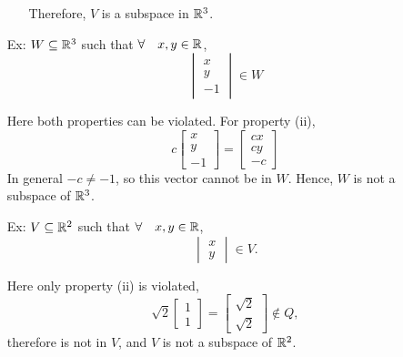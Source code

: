\documentclass[reqno]{amsart}
\theoremstyle{definition}
\begin{document}
\begin{enumerate}
\begin{itemize}
Therefore, $V$ is a subspace in $\mathbb{R}^3$.

\end{itemize}

\item[Ex:  ]  $W \subseteq \mathbb{R}^3$ such that $\forall\quad x,y\in \mathbb{R}$,
%
\begin{equation*}
\begin{vmatrix}
x\\
y\\
-1
\end{vmatrix} \in W
\end{equation*}

Here both properties can be violated.  For property (ii),
%
\begin{equation*}
c\begin{bmatrix}
x\\
y\\
-1
\end{bmatrix} = \begin{bmatrix}
cx\\
cy\\
-c
\end{bmatrix}
\end{equation*}
%
In general $-c \neq -1$, so this vector cannot be in $W$.  Hence, $W$ is not a subspace of $\mathbb{R}^3$.

\item[Ex:  ]  $V \subseteq \mathbb{R}^2$ such that $\forall\quad x,y\in \mathbb{R}$,
%
\begin{equation*}
\begin{vmatrix}
x\\
y
\end{vmatrix} \in V.
\end{equation*}


Here only property (ii) is violated,
%
\begin{equation*}
\sqrt{2}\begin{bmatrix}
1\\
1
\end{bmatrix} = \begin{bmatrix}
\sqrt{2}\\
\sqrt{2}
\end{bmatrix} \notin Q,
\end{equation*}
%
therefore is not in $V$, and $V$ is not a subspace of $\mathbb{R}^2$.

\end{enumerate}
\end{document}
